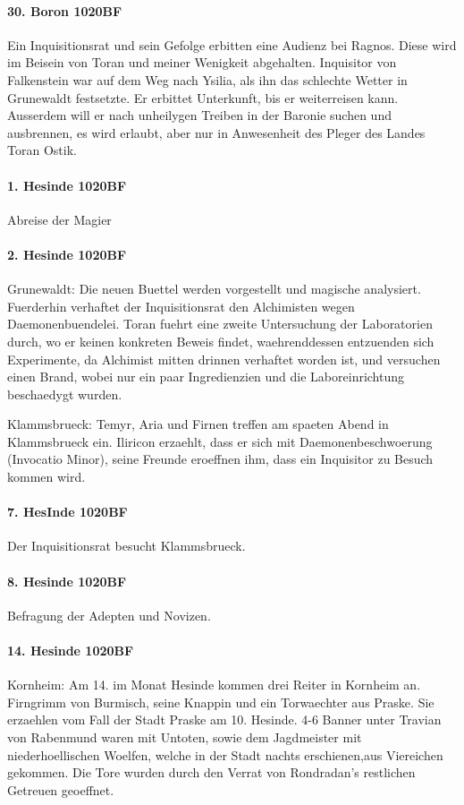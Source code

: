 \paragraph{30. Boron 1020BF}
Ein Inquisitionsrat und sein Gefolge erbitten eine Audienz bei Ragnos. Diese wird im Beisein von Toran und meiner Wenigkeit abgehalten. Inquisitor von Falkenstein war auf dem Weg nach Ysilia, als ihn das schlechte Wetter in Grunewaldt festsetzte. Er erbittet Unterkunft, bis er weiterreisen kann. Ausserdem will er nach unheilygen Treiben in der Baronie suchen und ausbrennen, es wird erlaubt, aber nur in Anwesenheit des Pleger des Landes Toran Ostik.

\paragraph{1. Hesinde 1020BF}
Abreise der Magier

\paragraph{2. Hesinde 1020BF}
Grunewaldt:
Die neuen Buettel werden vorgestellt und magische analysiert. Fuerderhin verhaftet der Inquisitionsrat den Alchimisten wegen Daemonenbuendelei. Toran fuehrt eine zweite Untersuchung der Laboratorien durch, wo er keinen konkreten Beweis findet, waehrenddessen entzuenden sich Experimente, da Alchimist mitten drinnen verhaftet worden ist, und versuchen einen Brand, wobei nur ein paar Ingredienzien und die Laboreinrichtung beschaedygt wurden.

Klammsbrueck:
Temyr, Aria und Firnen treffen am spaeten Abend in Klammsbrueck ein. Iliricon erzaehlt, dass er sich mit Daemonenbeschwoerung (Invocatio Minor), seine Freunde eroeffnen ihm, dass ein Inquisitor zu Besuch kommen wird.

\paragraph{7. HesInde 1020BF}
Der Inquisitionsrat besucht Klammsbrueck.

\paragraph{8. Hesinde 1020BF}
Befragung der Adepten und Novizen.

\paragraph{14. Hesinde 1020BF}
Kornheim:
Am 14. im Monat Hesinde kommen drei Reiter in Kornheim an. Firngrimm von Burmisch, seine Knappin und ein Torwaechter aus Praske. Sie erzaehlen vom Fall der Stadt Praske am 10. Hesinde. 4-6 Banner unter Travian von Rabenmund waren mit Untoten, sowie dem Jagdmeister mit niederhoellischen Woelfen, welche in der Stadt nachts erschienen,aus Viereichen gekommen. Die Tore wurden durch den Verrat von Rondradan's restlichen Getreuen geoeffnet.

